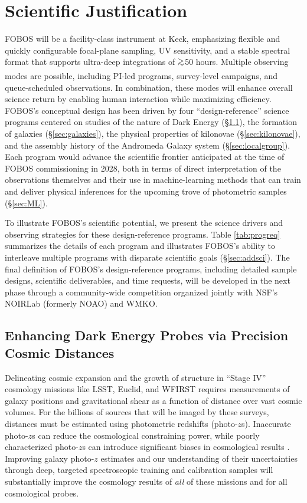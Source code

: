 \documentclass[oneside,11pt]{amsart}
\DeclareRobustCommand{\gtrsim}{%
\mathrel{\hskip-.5em\begin{array}{c}>\\[-8pt]\sim\end{array}\hskip-.5em}}
\begin{document}
\section{Scientific Justification} 
\label{sec:goals}

FOBOS will be a facility-class instrument at Keck, emphasizing flexible and quickly configurable focal-plane sampling, UV sensitivity, and a stable spectral format that supports ultra-deep integrations of $\gtrsim$50 hours.  Multiple observing modes are possible, including PI-led programs, survey-level campaigns, and queue-scheduled observations.  In combination, these modes will enhance overall science return by enabling human interaction while maximizing efficiency.  FOBOS's conceptual design has been driven by four ``design-reference'' science programs centered on studies of the nature of Dark Energy (\S \ref{sec:cosmology}), the formation of galaxies (\S \ref{sec:galaxies}), the physical properties of kilonovae (\S \ref{sec:kilonovae}), and the assembly history of the Andromeda Galaxy system (\S \ref{sec:localgroup}).  Each program would advance the scientific frontier anticipated at the time of FOBOS commissioning in 2028, both in terms of direct interpretation of the observations themselves and their use in machine-learning methods that can train and deliver physical inferences for the upcoming trove of photometric samples (\S \ref{sec:ML}).

To illustrate FOBOS's scientific potential, we present the science drivers and observing strategies for these design-reference programs.  Table \ref{tab:progreq} summarizes the details of each program and illustrates FOBOS's ability to interleave multiple programs with disparate scientific goals (\S \ref{sec:addsci}).  The final definition of FOBOS's design-reference programs, including detailed sample designs, scientific deliverables, and time requests, will be developed in the next phase through a community-wide competition organized jointly with NSF's NOIRLab (formerly NOAO) and WMKO.

\subsection{Enhancing Dark Energy Probes via Precision Cosmic Distances}
\label{sec:cosmology}

Delineating cosmic expansion and the growth of structure in ``Stage IV'' cosmology missions like LSST, Euclid, and WFIRST requires measurements of galaxy positions and gravitational shear as a function of distance over vast cosmic volumes. For the billions of sources that will be imaged by these surveys, distances must be estimated using photometric redshifts (photo-$z$s). Inaccurate photo-$z$s can reduce the cosmological constraining power, while poorly characterized photo-$z$s can introduce significant biases in cosmological results \citep{huterer06, LSSTDESCSRD}.  Improving galaxy photo-$z$ estimates and our understanding of their uncertainties through deep, targeted spectroscopic training and calibration samples will substantially improve the cosmology results of \emph{all} of these missions and for all cosmological probes.
\end{document}
